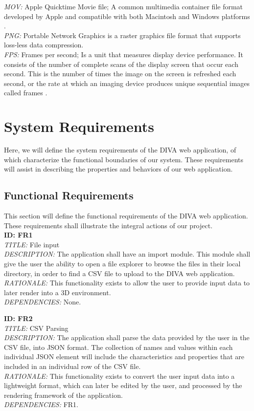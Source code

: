 \documentclass[journal,10pt,onecolumn,compsoc]{IEEEtran} \usepackage[margin=1.0in]{geometry} \usepackage{pdfpages}
\begin{document}
    \textit{MOV: }Apple Quicktime Movie file; A common multimedia container file format developed by Apple and compatible with both Macintosh and Windows platforms \cite{MOV}.\\
    \textit{PNG: }Portable Network Graphics is a raster graphics file format that supports loss-less data compression\cite{PNG}.\\
    \textit{FPS: }Frames per second; Is a unit that measures display device performance. It consists of the number of complete scans of the display screen that occur each second. This is the number of times the image on the screen is refreshed each second, or the rate at which an imaging device produces unique sequential images called frames \cite{FPS}.\\
    
\section{System Requirements}
\noindent Here, we will define the system requirements of the DIVA web application, of which characterize the functional boundaries of our system. These requirements will assist in describing the properties and behaviors of our web application.

    \subsection{Functional Requirements}
    This section will define the functional requirements of the DIVA web application. These requirements shall illustrate the integral actions of our project. \\
    \newpage
        \noindent \textbf{ID: FR1}\\
        \textit{TITLE:} File input\\
        \textit{DESCRIPTION:} The application shall have an import module. This module shall give the user the ability to open a file explorer to browse the files in their local directory, in order to find a CSV file to upload to the DIVA web application.\\
        \textit{RATIONALE:} This functionality exists to allow the user to provide input data to later render into a 3D environment.  \\
        \textit{DEPENDENCIES:} None.
        \newline
        
        \noindent \textbf{ID: FR2}\\
        \textit{TITLE:} CSV Parsing\\
        \textit{DESCRIPTION:} The application shall parse the data provided by the user in the CSV file, into JSON format. The collection of names and values within each individual JSON element will include the characteristics and properties that are included in an individual row of the CSV file.\\
        \textit{RATIONALE:} This functionality exists to convert the user input data into a lightweight format, which can later be edited by the user, and processed by the rendering framework of the application. \\
        \textit{DEPENDENCIES:} FR1.
        \newline
        
\end{document}
